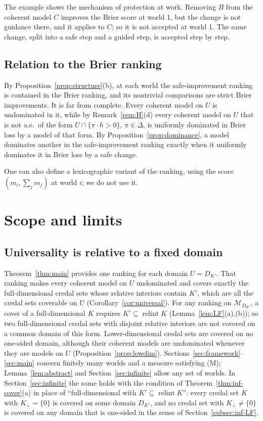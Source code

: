\documentclass[11pt]{article}
\newcommand{\M}{\mathcal{M}}
\DeclareMathOperator{\relint}{relint}
\theoremstyle{plain}
\theoremstyle{definition}
\theoremstyle{remark}
\begin{document}
The example shows the mechanism of protection at work. Removing $B$ from the coherent
model $C$ improves the Brier score at world 1, but the change is not guidance there, and it
applies to $C$; so it is not accepted at world 1. The same change, split into a safe step
and a guided step, is accepted step by step.

\subsection{Relation to the Brier ranking}

By Proposition~\ref{prop:structure}(b), at each world the safe-improvement ranking is
contained in the Brier ranking, and its nontrivial comparisons are strict Brier
improvements. It is far from complete. Every coherent model on $U$ is undominated in it,
while by Remark~\ref{rem:H}(d) every coherent model on $U$ that is not a.e.\ of the form
$U\cap\{\pi\cdot h>0\}$, $\pi\in\Delta$, is uniformly dominated in Brier loss by a model of
that form. By Proposition~\ref{prop:dominance}, a model dominates another in the
safe-improvement ranking exactly when it uniformly dominates it in Brier loss by a safe
change.

One can also define a lexicographic variant of the ranking, using the score
$(m_i,\sum_jm_j)$ at world $i$; we do not use it.

\section{Scope and limits}\label{sec:scope}

\subsection{Universality is relative to a fixed domain}

Theorem~\ref{thm:main} provides one ranking for each domain $U=D_{K'}$. That ranking makes
every coherent model on $U$ undominated and covers exactly the full-dimensional credal
sets whose relative interiors contain $K'$, which are all the credal sets coverable on $U$
(Corollary~\ref{cor:universal}). For any ranking on $\M_{D_{K'}}$, a cover of a
full-dimensional $K$ requires $K'\subseteq\relint K$ (Lemma~\ref{lem:LF}(a),(b)); so two
full-dimensional credal sets with disjoint relative interiors are not covered on a common
domain of this form. Lower-dimensional credal sets are covered on no one-sided domain,
although their coherent models are undominated whenever they are models on $U$
(Proposition~\ref{prop:lowdim}). Sections~\ref{sec:framework}--\ref{sec:main} concern
finitely many worlds and a measure satisfying (M); Lemma~\ref{lem:abstract} and
Section~\ref{sec:infinite} allow any set of worlds. In Section~\ref{sec:infinite} the same
holds with the condition of Theorem~\ref{thm:inf-cover}(a) in place of ``full-dimensional
with $K'\subseteq\relint K$'': every credal set $K$ with $K_\perp=\{0\}$ is covered on some
domain $D_{K'}$, and no credal set with $K_\perp\ne\{0\}$ is covered on any domain that is
one-sided in the sense of Section~\ref{subsec:inf-LF}.
\end{document}
